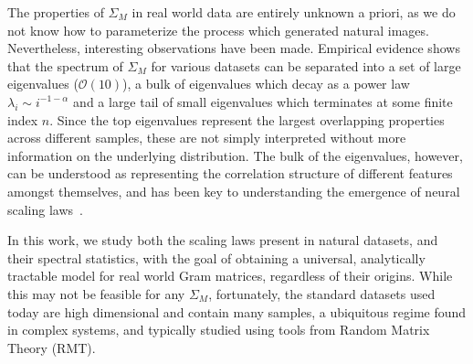 \documentclass{article}
\begin{document}
The properties of $\Sigma_M$ in real world data are entirely unknown a priori, as we do not know how to parameterize the process which generated natural images. Nevertheless, interesting observations have been made. Empirical evidence shows that the spectrum of $\Sigma_M$ for various datasets can be separated into a set of large eigenvalues ($\mathcal{O}(10)$), a bulk of eigenvalues which decay as a power law $\lambda_i \sim i^{-1-\alpha}$ \citep{Ruderman1997,Caponnetto2007} and a large tail of small eigenvalues which terminates at some finite index $n$. Since the top eigenvalues represent the largest overlapping properties across different samples, these are not simply interpreted without more information on the underlying distribution. The bulk of the eigenvalues, however, can be understood as representing the correlation structure of different features amongst themselves, and has been key to understanding the emergence of neural scaling laws~\citep{kaplan2020scaling, maloney2022solvable}. 

In this work, we study both the scaling laws present in natural datasets, and their spectral statistics, with the goal of obtaining a universal, analytically tractable model for real world Gram matrices, regardless of their origins. While this may not be feasible for any $\Sigma_M$, fortunately, the standard datasets used today are high dimensional and contain many samples, a ubiquitous regime found in complex systems, and typically studied using tools from Random Matrix Theory (RMT).
\end{document}
